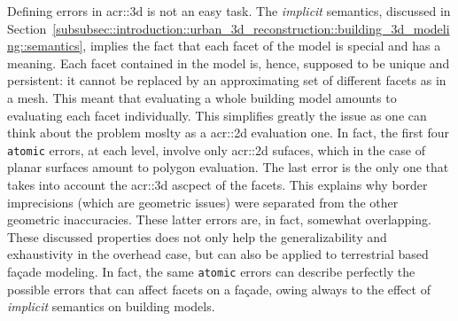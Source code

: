             \begin{figure}[htbp]
                \centering
            \end{figure}

            Defining errors in \gls{acr::3d} is not an easy task.
            The \textit{implicit} semantics, discussed in Section~\ref{subsubsec::introduction::urban_3d_reconstruction::building_3d_modeling::semantics}, implies the fact that each facet of the model is special and has a meaning.
            Each facet contained in the model is, hence, supposed to be unique and persistent: it cannot be replaced by an approximating set of different facets as in a mesh.
            This meant that evaluating a whole building model amounts to evaluating each facet individually.
            This simplifies greatly the issue as one can think about the problem moslty as a \gls{acr::2d} evaluation one.
            In fact, the first four \texttt{atomic} errors, at each level, involve only \gls{acr::2d} sufaces, which in the case of planar surfaces amount to polygon evaluation.
            The last error is the only one that takes into account the \gls{acr::3d} ascpect of the facets.
            This explains why border imprecisions (which are geometric issues) were separated from the other geometric inaccuracies.
            These latter errors are, in fact, somewhat overlapping.
            These discussed properties does not only help the generalizability and exhaustivity in the overhead case, but can also be applied to terrestrial based fa\c{c}ade modeling.
            In fact, the same \texttt{atomic} errors can describe perfectly the possible errors that can affect facets on a fa\c{c}ade, owing always to the effect of \textit{implicit} semantics on building models.
        
